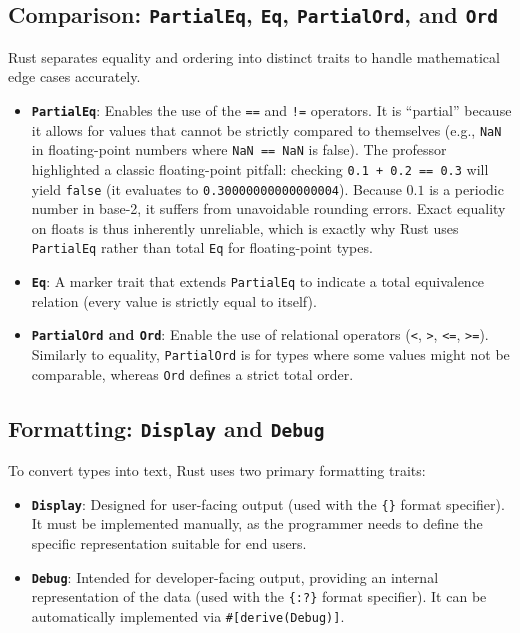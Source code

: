 \subsection*{Comparison: \texttt{PartialEq}, \texttt{Eq}, \texttt{PartialOrd}, and \texttt{Ord}}
Rust separates equality and ordering into distinct traits to handle mathematical edge cases accurately.
\begin{itemize}
    \item \textbf{\texttt{PartialEq}}: Enables the use of the \texttt{==} and \texttt{!=} operators. It is ``partial'' because it allows for values that cannot be strictly compared to themselves (e.g., \texttt{NaN} in floating-point numbers where \texttt{NaN == NaN} is false). The professor highlighted a classic floating-point pitfall: checking \texttt{0.1 + 0.2 == 0.3} will yield \texttt{false} (it evaluates to \texttt{0.30000000000000004}). Because $0.1$ is a periodic number in base-2, it suffers from unavoidable rounding errors. Exact equality on floats is thus inherently unreliable, which is exactly why Rust uses \texttt{PartialEq} rather than total \texttt{Eq} for floating-point types.
    \item \textbf{\texttt{Eq}}: A marker trait that extends \texttt{PartialEq} to indicate a total equivalence relation (every value is strictly equal to itself).
    \item \textbf{\texttt{PartialOrd} and \texttt{Ord}}: Enable the use of relational operators (\texttt{<}, \texttt{>}, \texttt{<=}, \texttt{>=}). Similarly to equality, \texttt{PartialOrd} is for types where some values might not be comparable, whereas \texttt{Ord} defines a strict total order.
\end{itemize}

\subsection*{Formatting: \texttt{Display} and \texttt{Debug}}
To convert types into text, Rust uses two primary formatting traits:
\begin{itemize}
    \item \textbf{\texttt{Display}}: Designed for user-facing output (used with the \texttt{\{\}} format specifier). It must be implemented manually, as the programmer needs to define the specific representation suitable for end users.
    \item \textbf{\texttt{Debug}}: Intended for developer-facing output, providing an internal representation of the data (used with the \texttt{\{:?\}} format specifier). It can be automatically implemented via \texttt{\#[derive(Debug)]}.
\end{itemize}


